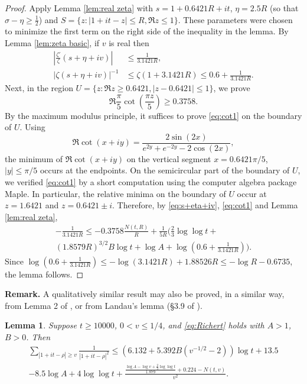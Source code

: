 \documentclass[10pt]{amsart}
\theoremstyle{remark}
\theoremstyle{plain}
\newtheorem{lemma}{Lemma}[section]
\numberwithin{equation}{section}
\theoremstyle{definition}
\def\({\left(}
\def\){\right)}
\def\pfrac#1#2{\left(\frac{#1}{#2}\right)}
\begin{document}
\begin{proof}
Apply Lemma \ref{lem:real zeta} with  $s=1+0.6421R+it$, $\eta=2.5R$ 
(so that $\sigma-\eta\ge 
\frac12$) and $S=\{z: |1+it-z|\le R, \Re z \le 1 \}$.
These parameters were chosen to minimize the first term on the right side
of the inequality in the lemma.
By Lemma \ref{lem:zeta basic}, if $v$ is real then
\begin{equation}
\begin{split}
\left| \frac{\zeta'}{\zeta}(s+\eta+iv) \right| &\le \frac{1}{3.1421R}, \\
|\zeta(s+\eta+iv)|^{-1} &\le \zeta(1+3.1421 R)\le 0.6+ \frac{1}{3.1421R}.
\end{split}
\label{eq:s+eta+iv}
\end{equation}
Next, in the region $U=\{ z: \Re z \ge 0.6421, |z-0.6421|\le 1\}$,
we prove
\begin{equation}
\Re \frac{\pi}{5} \cot \pfrac{\pi z}{5} \ge 0.3758. \label{eq:cot1}
\end{equation}
By the maximum modulus principle, it suffices to prove \eqref{eq:cot1}
on the boundary of $U$.  Using
$$
\Re \cot(x+iy) = \frac{2\sin(2x)}{e^{2y}+e^{-2y}-2\cos(2x)},
$$
the minimum of $\Re \cot(x+iy)$ on the vertical segment $x=0.6421\pi/5$,
$|y| \le \pi/5$ occurs at the endpoints.  On the semicircular part of the
boundary of $U$, we verified \eqref{eq:cot1} by
a short computation using the computer algebra package Maple.
In particular, the relative 
minima on the boundary of $U$ occur at $z=1.6421$ and $z=0.6421\pm i$.
Therefore, by \eqref{eq:s+eta+iv},
\eqref{eq:cot1} and Lemma \ref{lem:real zeta},
\begin{multline*}
-\frac{1}{3.1421R} \le  -0.3758 \frac{N(t,R)}{R} + \frac{1}{5R}
\biggl( \frac23 \log\log t + \\ (1.8579R)^{3/2}B\log t + 
 \log A + \log\( 0.6+\tfrac{1}{3.1421R} \) \biggr).
\end{multline*}
Since $\log(0.6+\frac{1}{3.1421R}) \le -\log(3.1421R)+1.88526R \le -\log R
-0.6735$, the lemma follows.
\end{proof}

{\bf Remark.}  A qualitatively similar result
 may also be proved, in a similar way, from
Lemma 2 of \cite{HB1}, or from Landau's lemma (\S 3.9 of \cite{T}).
\bigskip

%
%

\begin{lemma}\label{lem:zeros near 1+it}
Suppose $t\ge 10000$,
$0<v\le 1/4$, and \eqref{eq:Richert} holds with $A>1$, $B>0$.  Then
\begin{multline*}
\sum_{|1+it-\rho|\ge v} \frac{1}{|1+it-\rho|^2} 
\le (6.132 + 5.392 B (v^{-1/2}-2)) \log t + 13.5\\ -8.5\log A 
+ 4 \log\log t + \frac{\frac{\log A-\log v+\tfrac23\log\log t}{1.879}
+0.224 - N(t,v)}{v^2}.
\end{multline*}
\end{lemma}
\end{document}
